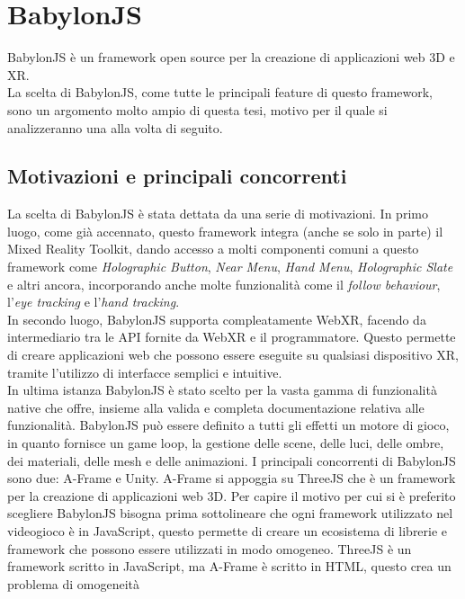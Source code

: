\section{BabylonJS}\label{sec:BabylonJS}
BabylonJS è un framework open source per la creazione di applicazioni web 3D e XR\cite{BabylonJS}.\\
La scelta di BabylonJS, come tutte le principali feature di questo framework, sono un argomento molto ampio di questa tesi, motivo per il quale si analizzeranno una alla volta di seguito.

\subsection{Motivazioni e principali concorrenti}\label{subsec:BabylonJS_motivazioni}
La scelta di BabylonJS è stata dettata da una serie di motivazioni. In primo luogo, come già accennato, questo framework integra (anche se solo in parte) il Mixed Reality
Toolkit, dando accesso a molti componenti comuni a questo framework come \textit{Holographic Button}, \textit{Near Menu}, \textit{Hand Menu}, \textit{Holographic Slate} e altri 
ancora, incorporando anche molte funzionalità come il \textit{follow behaviour}, l'\textit{eye tracking} e l'\textit{hand tracking}.\\
In secondo luogo, BabylonJS supporta compleatamente WebXR, facendo da intermediario tra le API fornite da WebXR e il programmatore. Questo permette di creare applicazioni web
che possono essere eseguite su qualsiasi dispositivo XR, tramite l'utilizzo di interfacce semplici e intuitive.\\
In ultima istanza BabylonJS è stato scelto per la vasta gamma di funzionalità native che offre, insieme alla valida e completa documentazione relativa alle funzionalità. BabylonJS
può essere definito a tutti gli effetti un motore di gioco, in quanto fornisce un game loop, la gestione delle scene, delle luci, delle ombre, dei materiali, delle mesh e 
delle animazioni.
\newline \newline
I principali concorrenti di BabylonJS sono due: A-Frame e Unity. A-Frame si appoggia su ThreeJS che è un framework per la creazione di applicazioni web 3D. Per capire il motivo per
cui si è preferito scegliere BabylonJS bisogna prima sottolineare che ogni framework utilizzato nel videogioco è in JavaScript, questo permette di creare un ecosistema di librerie
e framework che possono essere utilizzati in modo omogeneo. ThreeJS è un framework scritto in JavaScript, ma A-Frame è scritto in HTML, questo crea un problema di omogeneità
